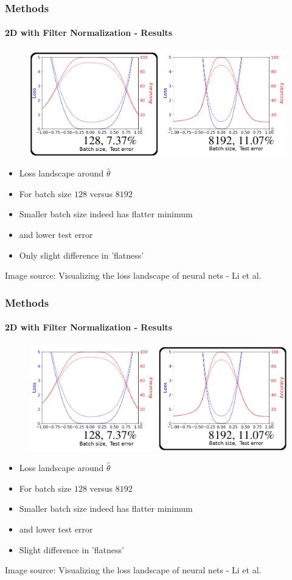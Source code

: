 \documentclass[9pt]{beamer}
\begin{document}
\begin{frame}
\frametitle{Methods}
\framesubtitle{2D with Filter Normalization - Results}
\begin{figure}
	\includegraphics[width=.85\linewidth]{figures/batch_size_normalized_1.png}
\end{figure}
\begin{itemize}
	\item Loss landscape around $\hat{\theta }$
	\item For batch size $128$ versus $8192$
	\item Smaller batch size indeed has flatter minimum
	\item and lower test error
	\item Only slight difference in 'flatness'
\end{itemize}
\tiny\color{lightgray}Image source: Visualizing the loss landscape of neural nets - Li et al.
\end{frame}
\begin{frame}
\frametitle{Methods}
\framesubtitle{2D with Filter Normalization - Results}
\begin{figure}
	\includegraphics[width=.85\linewidth]{figures/batch_size_normalized_2.png}
\end{figure}
\begin{itemize}
	\item Loss landscape around $\hat{\theta }$
	\item For batch size $128$ versus $8192$
	\item Smaller batch size indeed has flatter minimum
	\item and lower test error
	\item Slight difference in 'flatness'
\end{itemize}
\tiny\color{lightgray}Image source: Visualizing the loss landscape of neural nets - Li et al.
\end{frame}
\end{document}
